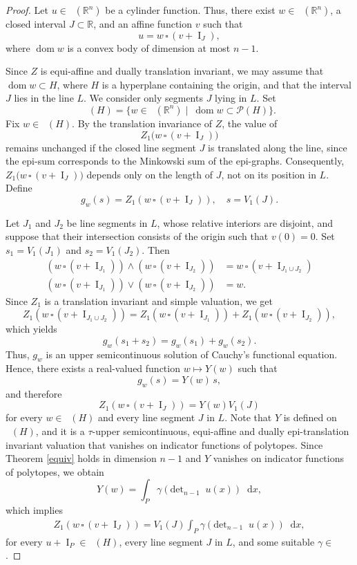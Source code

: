 \documentclass[11pt]{article}
\theoremstyle{definition} %
\newcommand{\dif}{\mathop{}\!\mathrm{d}}
\newcommand{\RR}{(\mathbb{R}^n)}
\DeclareMathOperator{\I}{I}
\DeclareMathOperator{\dom}{dom}
\DeclareMathOperator{\D}{D^2}
\DeclareMathOperator{\LP}{Conv_{lp}}
\DeclareMathOperator{\conc}{Conc([0,\infty))}
\begin{document}
\begin{proof}
Let $u \in \LP(\mathbb{R}^n)$ be a cylinder function.  
Thus, there exist $w \in \LP(\mathbb{R}^n)$, a closed interval $J\subset \mathbb{R}$,  
and an affine function $v$ such that
$$
u = w \,\square\, (v + \I_J),
$$
where $\dom w$ is a convex body of dimension at most $n-1$.

Since $Z$ is equi-affine and dually translation invariant, we may assume that $\dom w \subset H$, where $H$ is a hyperplane containing the origin,  
and that the interval $J$ lies in the line $L$.
We consider only segments $J$ lying in $L$. Set
$$\LP(H)=\bigl\{w\in\LP\RR\mid \ \dom w\subset \mathcal{P}(H)\bigr\}.$$  
Fix $w  \in \LP(H)$.  By the translation invariance of $Z$, the value of
$$
Z_1\big(w \,\square\, (v + \I_J)\big)
$$
remains unchanged if the closed line segment $J$ is translated along the   line,  since the epi-sum corresponds to the Minkowski sum of the epi-graphs. Consequently, $Z_1\big(w \,\square\, (v + \I_J)\big)$ depends only on the length of $J$, not on its position in $L$. Define
$$g_w(s)= Z_1(w\,\square\, (v+\I_{J})),\quad  s=V_1(J).$$

Let $J_1$ and $J_2$ be line segments in $L$, whose relative interiors are disjoint, and suppose that their  intersection consists of the origin  such that $v(0) = 0$. 
Set $s_1 = V_1(J_1)$ and $s_2 = V_1(J_2)$. Then
\begin{align*}
    (w\,\square\, (v+\I_{J_1}))\wedge (w\,\square\, (v+\I_{J_2})) & =w\,\square\, (v+\I_{J_1\cup J_2})\\
    (w\,\square\, (v+\I_{J_1}))\vee (w\,\square\, (v+\I_{J_2})) & =w.
\end{align*}
Since $Z_1$ is a translation invariant and simple valuation, we get
$$Z_1(w\,\square\, (v+\I_{J_1\cup J_2}))= Z_1(w\,\square\, (v+\I_{J_1}))+Z_1(w\,\square\, (v+\I_{J_2})),$$
which yields
$$g_w(s_1+s_2)=g_w(s_1)+g_w(s_2).$$
Thus, $g_w$ is an upper semicontinuous solution of Cauchy’s functional equation. Hence, there exists a real-valued function $w \mapsto Y(w)$ such that
$$g_w(s)= Y(w)\,s,$$
and therefore
$$Z_1(w\,\square\, (v+\I_{J}))=Y(w)V_1(J)$$
for every $w\in \LP(H)$ and every line segment $J$ in $L$. Note that $Y$ is defined on $\LP(H)$, and it is a $\tau$-upper semicontinuous,  equi-affine and  dually epi-translation invariant  valuation that vanishes on indicator functions of polytopes. Since Theorem \ref{equiv} holds in dimension $n-1$  and $Y$ vanishes on indicator functions of polytopes, we obtain
$$Y(w)= \int_P \gamma(\mbox{det}_{n-1} \D u(x))\dif x,$$
which implies
\begin{align}\label{v}
Z_1(w\,\square\, (v+\I_{J}))= V_1(J)\int_P \gamma(\mbox{det}_{n-1} \D u(x))\dif x, 
\end{align}
for every $u+\I_P\in \LP(H)$, every line segment $J$ in $L$, and some suitable $ \gamma\in\conc$.




\end{proof}
\end{document}
